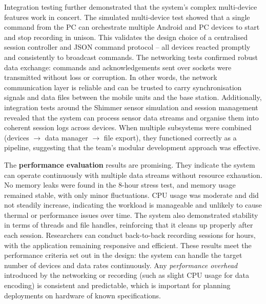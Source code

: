 Integration testing further demonstrated that the system's complex multi-device features work in concert. The simulated multi-device test showed that a single command from the PC can orchestrate multiple Android and PC devices to start and stop recording in unison. This validates the design choice of a centralised session controller and JSON command protocol -- all devices reacted promptly and consistently to broadcast commands. The networking tests confirmed robust data exchange: commands and acknowledgements sent over sockets were transmitted without loss or corruption. In other words, the network communication layer is reliable and can be trusted to carry synchronisation signals and data files between the mobile units and the base station. Additionally, integration tests around the Shimmer sensor simulation and session management revealed that the system can process sensor data streams and organise them into coherent session logs across devices. When multiple subsystems were combined (devices $\rightarrow$ data manager $\rightarrow$ file export), they functioned correctly as a pipeline, suggesting that the team's modular development approach was effective.

The \textbf{performance evaluation} results are promising. They indicate the system can operate continuously with multiple data streams without resource exhaustion. No memory leaks were found in the 8-hour stress test, and memory usage remained stable, with only minor fluctuations. CPU usage was moderate and did not steadily increase, indicating the workload is manageable and unlikely to cause thermal or performance issues over time. The system also demonstrated stability in terms of threads and file handles, reinforcing that it cleans up properly after each session. Researchers can conduct back-to-back recording sessions for hours, with the application remaining responsive and efficient. These results meet the performance criteria set out in the design: the system can handle the target number of devices and data rates continuously. Any \emph{performance overhead} introduced by the networking or recording (such as slight CPU usage for data encoding) is consistent and predictable, which is important for planning deployments on hardware of known specifications.

